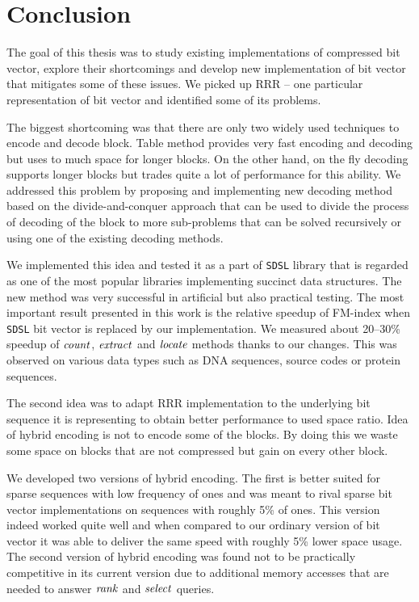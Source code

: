 \chapter*{Conclusion}  %

The goal of this thesis was to study existing implementations of compressed
bit vector, explore their shortcomings and develop new implementation of bit
vector that mitigates some of these issues. We picked up RRR -- one particular
representation of bit vector and identified some of its problems.

The biggest shortcoming was that there are only two widely used techniques to
encode and decode block. Table method provides very fast encoding and decoding
but uses to much space for longer blocks. On the other hand, on the fly decoding
supports longer blocks but trades quite a lot of performance for this ability.
We addressed this problem by proposing and implementing new decoding method based
on the divide-and-conquer approach that can be used to divide the process of decoding
of the block to more sub-problems that can be solved recursively or using one of the
existing decoding methods.

We implemented this idea and tested it as a part of \texttt{SDSL} library that is
regarded as one of the most popular libraries implementing succinct data structures.
The new method was very successful in artificial but also practical testing. The most
important result presented in this work is the relative speedup of FM-index when
\texttt{SDSL} bit vector is replaced by our implementation. We measured about 20--30\%
speedup of $\mathit{count}$, $\mathit{extract}$ and $\mathit{locate}$ methods thanks to our changes. This
was observed on various data types such as DNA sequences, source codes or protein sequences.

The second idea was to adapt RRR implementation to the underlying bit sequence it is
representing to obtain better performance to used space ratio. Idea of hybrid encoding
is not to encode some of the blocks. By doing this we waste some space on blocks that
are not compressed but gain on every other block.

We developed two versions of hybrid encoding. The first is better suited for sparse
sequences with low frequency of ones and was meant to rival sparse bit vector implementations
on sequences with roughly 5\% of ones. This version indeed worked quite well and when
compared to our ordinary version of bit vector it was able to deliver the same speed
with roughly 5\% lower space usage. The second version of hybrid encoding was found
not to be practically competitive in its current version due to additional memory
accesses that are needed to answer $\mathit{rank}$ and $\mathit{select}$ queries. 

